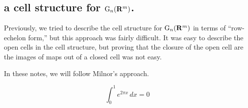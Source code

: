 \documentclass{amsart}
\newcommand{\G}{\mathrm{G}}
\begin{document}
\subsection*{a cell structure for $\G_{n}(\R^{m})$.}
Previously, we tried to describe the cell structure for
$\G_{n}(\R^{m})$ in terms of ``row-echelon form,'' but this approach
was fairly difficult. It was easy to describe the open 
cells in the cell structure, but proving that the closure of the open
cell are the images of maps out of a closed cell was not easy.

In these notes, we will follow Milnor's approach.

\begin{equation*}
  \int_{0}^{1}e^{2\pi x}\,dx=0
\end{equation*}
\end{document}
